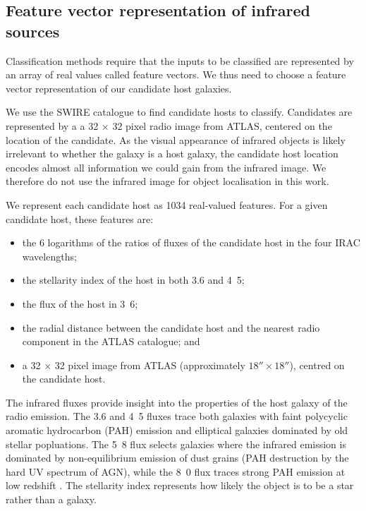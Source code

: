 \documentclass[fleqn,usenatbib,usedcolumn]{mnras}
\begin{document}
  \subsection{Feature vector representation of infrared sources}
  \label{vector-representation-of-infrared-sources}

    Classification methods require that the inputs to be classified are
    represented by an array of real values called feature vectors. We thus
    need to choose a feature vector representation of our candidate host
    galaxies.

    We use the SWIRE catalogue to find candidate
    hosts to classify. Candidates are represented by a a 32 $\times$ 32 pixel radio image from
    ATLAS, centered on the location of the candidate.
    As the visual appearance of infrared objects is likely irrelevant to
    whether the galaxy is a host galaxy, the candidate host location encodes
    almost all information we could gain from the infrared image. We therefore
    do not use the infrared image for object localisation in this work.

    We represent each candidate host as 1034 real-valued features. For a given
    candidate host, these features are:
    \begin{itemize}
      \item the 6 logarithms of the ratios of fluxes of the candidate
        host in the four IRAC wavelengths;
      \item the stellarity index of the host in both 3.6 and
        \unit{4.5}{\micro\meter};
      \item the flux of the host in \unit{3.6}{\micro\meter};
      \item the radial distance between the candidate host and the nearest
        radio component in the ATLAS catalogue; and
      \item a 32 $\times$ 32 pixel image from ATLAS (approximately $18''
        \times 18''$), centred on the candidate host.
    \end{itemize}

    The infrared fluxes provide insight into the properties of the host galaxy
    of the radio emission. The 3.6 and \unit{4.5}{\micro\meter} fluxes trace
    both galaxies with faint polycyclic aromatic hydrocarbon (PAH) emission and
    elliptical galaxies dominated by old stellar popluations. The
    \unit{5.8}{\micro\meter} flux selects galaxies where the infrared emission
    is dominated by non-equilibrium emission of dust grains (PAH destruction
    by the hard UV spectrum of AGN), while the \unit{8.0}{\micro\meter} flux
    traces strong PAH emission at low redshift \citep{Sajina2005}.
    The stellarity index represents how likely the object is to be a star
    rather than a galaxy.
\end{document}
